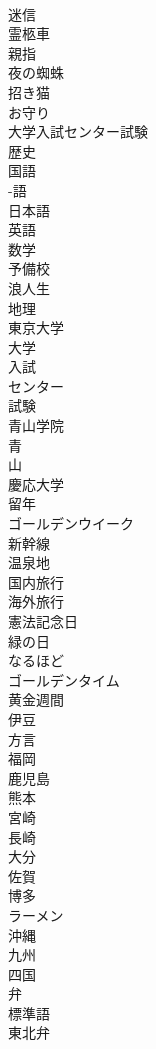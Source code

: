 \documentclass[8pt]{extreport}
\begin{document}
\begin{CJK}{UTF8}{min}
\\	迷信
\\	霊柩車
\\	親指
\\	夜の蜘蛛
\\	招き猫
\\	お守り
\\	大学入試センター試験
\\	歴史
\\	国語
\\	-語
\\	日本語
\\	英語
\\	数学
\\	予備校
\\	浪人生
\\	地理
\\	東京大学
\\	大学
\\	入試
\\	センター
\\	試験
\\	青山学院
\\	青
\\	山
\\	慶応大学
\\	留年
\\	ゴールデンウイーク
\\	新幹線
\\	温泉地
\\	国内旅行
\\	海外旅行
\\	憲法記念日
\\	緑の日
\\	なるほど
\\	ゴールデンタイム
\\	黄金週間
\\	伊豆
\\	方言
\\	福岡
\\	鹿児島
\\	熊本
\\	宮崎
\\	長崎
\\	大分
\\	佐賀
\\	博多
\\	ラーメン
\\	沖縄
\\	九州
\\	四国
\\	弁
\\	標準語
\\	東北弁

\end{CJK}
\end{document}
